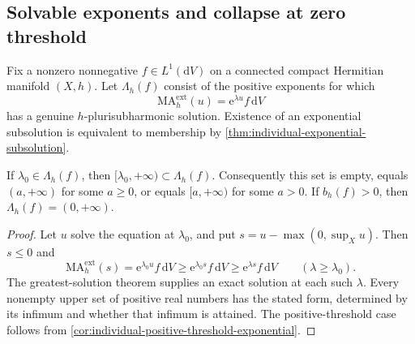 \subsection{Solvable exponents and collapse at zero threshold}

Fix a nonzero nonnegative $f\in L^1(\mathrm dV)$ on a connected compact Hermitian manifold $(X,h)$. Let $\Lambda_h(f)$ consist of the positive exponents for which
\[
 \mathrm{MA}^{\mathrm{ext}}_h(u)=\mathrm e^{\lambda u}f\,\mathrm dV
\]
has a genuine $h$-plurisubharmonic solution. Existence of an exponential subsolution is equivalent to membership by \cref{thm:individual-exponential-subsolution}.

\begin{proposition}\label{prop:solvable-exponents-upper-interval}
If $\lambda_0\in\Lambda_h(f)$, then $[\lambda_0,+\infty)\subset\Lambda_h(f)$. Consequently this set is empty, equals $(a,+\infty)$ for some $a\geq0$, or equals $[a,+\infty)$ for some $a>0$. If $b_h(f)>0$, then $\Lambda_h(f)=(0,+\infty)$.
\end{proposition}
\begin{proof}
Let $u$ solve the equation at $\lambda_0$, and put $s=u-\max(0,\sup_Xu)$. Then $s\leq0$ and
\[
 \mathrm{MA}^{\mathrm{ext}}_h(s)
 =\mathrm e^{\lambda_0u}f\,\mathrm dV
 \geq\mathrm e^{\lambda_0s}f\,\mathrm dV
 \geq\mathrm e^{\lambda s}f\,\mathrm dV
 \qquad(\lambda\geq\lambda_0).
\]
The greatest-solution theorem supplies an exact solution at each such $\lambda$. Every nonempty upper set of positive real numbers has the stated form, determined by its infimum and whether that infimum is attained. The positive-threshold case follows from \cref{cor:individual-positive-threshold-exponential}.
\end{proof}

